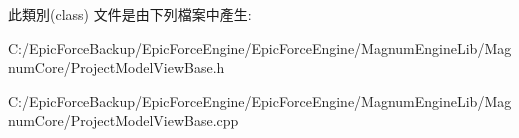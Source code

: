 此類別(class) 文件是由下列檔案中產生\+:\begin{DoxyCompactItemize}
\item 
C\+:/\+Epic\+Force\+Backup/\+Epic\+Force\+Engine/\+Epic\+Force\+Engine/\+Magnum\+Engine\+Lib/\+Magnum\+Core/Project\+Model\+View\+Base.\+h\item 
C\+:/\+Epic\+Force\+Backup/\+Epic\+Force\+Engine/\+Epic\+Force\+Engine/\+Magnum\+Engine\+Lib/\+Magnum\+Core/Project\+Model\+View\+Base.\+cpp\end{DoxyCompactItemize}
